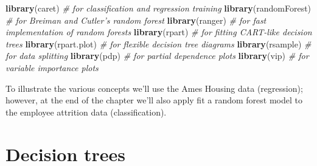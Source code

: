 \documentclass[]{book}
\newenvironment{Shaded}{\begin{snugshade}}{\end{snugshade}}
\newcommand{\CommentTok}[1]{\textcolor[rgb]{0.56,0.35,0.01}{\textit{#1}}}
\newcommand{\DataTypeTok}[1]{\textcolor[rgb]{0.13,0.29,0.53}{#1}}
\newcommand{\DecValTok}[1]{\textcolor[rgb]{0.00,0.00,0.81}{#1}}
\newcommand{\FloatTok}[1]{\textcolor[rgb]{0.00,0.00,0.81}{#1}}
\newcommand{\KeywordTok}[1]{\textcolor[rgb]{0.13,0.29,0.53}{\textbf{#1}}}
\newcommand{\NormalTok}[1]{#1}
\newcommand{\OperatorTok}[1]{\textcolor[rgb]{0.81,0.36,0.00}{\textbf{#1}}}
\newcommand{\StringTok}[1]{\textcolor[rgb]{0.31,0.60,0.02}{#1}}
\theoremstyle{definition}
\theoremstyle{definition}
\theoremstyle{definition}
\theoremstyle{remark}
\begin{document}
\begin{Shaded}
\begin{Highlighting}[]
\KeywordTok{library}\NormalTok{(caret)         }\CommentTok{# for classification and regression training}
\KeywordTok{library}\NormalTok{(randomForest)  }\CommentTok{# for Breiman and Cutler's random forest}
\KeywordTok{library}\NormalTok{(ranger)        }\CommentTok{# for fast implementation of random forests}
\KeywordTok{library}\NormalTok{(rpart)         }\CommentTok{# for fitting CART-like decision trees}
\KeywordTok{library}\NormalTok{(rpart.plot)    }\CommentTok{# for flexible decision tree diagrams}
\KeywordTok{library}\NormalTok{(rsample)       }\CommentTok{# for data splitting }
\KeywordTok{library}\NormalTok{(pdp)           }\CommentTok{# for partial dependence plots}
\KeywordTok{library}\NormalTok{(vip)           }\CommentTok{# for variable importance plots}
\end{Highlighting}
\end{Shaded}

To illustrate the various concepts we'll use the Ames Housing data
(regression); however, at the end of the chapter we'll also apply fit a
random forest model to the employee attrition data (classification).

\begin{Shaded}
\end{Shaded}

\hypertarget{decision-trees}{%
\section{Decision trees}\label{decision-trees}}
\end{document}
